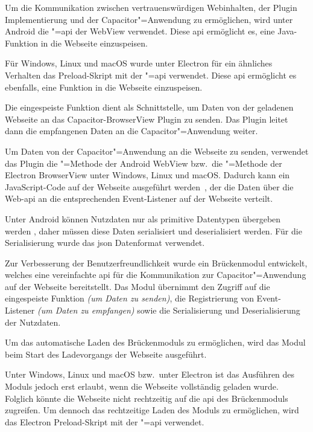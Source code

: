 Um die Kommunikation zwischen vertrauenswürdigen Webinhalten, der Plugin Implementierung und der Capacitor"=Anwendung zu ermöglichen, wird unter Android die "=\acs{api} der WebView verwendet.
Diese \ac{api} ermöglicht es, eine Java-Funktion in die Webseite einzuspeisen.~\cite{android:api}

Für Windows, Linux und macOS wurde unter Electron für ein ähnliches Verhalten das Preload-Skript mit der "=\acs{api} verwendet.
Diese \ac{api} ermöglicht es ebenfalls, eine Funktion in die Webseite einzuspeisen.~\cite{electron:docs}

Die eingespeiste Funktion dient als Schnittstelle, um Daten von der geladenen Webseite an das Capacitor-BrowserView Plugin zu senden.
Das Plugin leitet dann die empfangenen Daten an die Capacitor"=Anwendung weiter.

Um Daten von der Capacitor"=Anwendung an die Webseite zu senden, verwendet das Plugin die "=Methode der Android WebView bzw.\ die "=Methode der Electron BrowserView unter Windows, Linux und macOS\@.
Dadurch kann ein JavaScript-Code auf der Webseite ausgeführt werden~\cite{android:api, electron:docs}, der die Daten über die  Web-\acs{api} an die entsprechenden Event-Listener auf der Webseite verteilt.~\cite{web:api}

Unter Android können Nutzdaten nur als primitive Datentypen übergeben werden \cite{android:api}, daher müssen diese Daten serialisiert und deserialisiert werden.
Für die Serialisierung wurde das \ac{json} Datenformat verwendet.

Zur Verbesserung der Benutzerfreundlichkeit wurde ein Brückenmodul entwickelt, welches eine vereinfachte \ac{api} für die Kommunikation zur Capacitor"=Anwendung auf der Webseite bereitstellt.
Das Modul übernimmt den Zugriff auf die eingespeiste Funktion \textit{(um Daten zu senden)}, die Registrierung von Event-Listener \textit{(um Daten zu empfangen)} sowie die Serialisierung und Deserialisierung der Nutzdaten.

Um das automatische Laden des Brückenmoduls zu ermöglichen, wird das Modul beim Start des Ladevorgangs der Webseite ausgeführt.

Unter Windows, Linux und macOS bzw.\ unter Electron ist das Ausführen des Moduls jedoch erst erlaubt, wenn die Webseite vollständig geladen wurde.
Folglich könnte die Webseite nicht rechtzeitig auf die \ac{api} des Brückenmoduls zugreifen.
Um dennoch das rechtzeitige Laden des Moduls zu ermöglichen, wird das Electron Preload-Skript mit der "=\acs{api} verwendet.
\cite{electron:docs}
